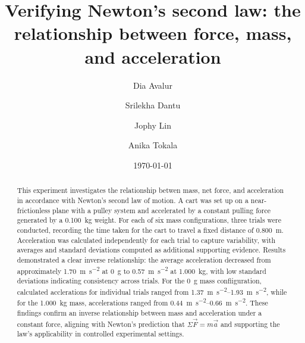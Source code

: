 ﻿\documentclass[reprint,amsmath,amssymb,aps]{revtex4-2}
\begin{document}
\title{Verifying Newton's second law: the relationship between force, mass, and acceleration}
\author{Dia Avalur}
\author{Srilekha Dantu}
\author{Jophy Lin}
\author{Anika Tokala}
\date{\today}

\begin{abstract}
This experiment investigates the relationship betwen mass, net force, and acceleration in accordance with Newton's second law of motion. A cart was set up on a near-frictionless plane with a pulley system and accelerated by a constant pulling force generated by a \qty{0.100}{\kilo\gram} weight. For each of six mass configurations, three trials were conducted, recording the time taken for the cart to travel a fixed distance of \qty{0.800}{\meter}. Acceleration was calculated independently for each trial to capture variability, with averages and standard deviations computed as additional supporting evidence. Results demonstrated a clear inverse relationship: the average acceleration decreased from approximately \qty{1.70}{\meter\per\second\squared} at \qty{0}{\gram} to \qty{0.57}{\meter\per\second\squared} at \qty{1.000}{\kilo\gram}, with low standard deviations indicating consistency across trials. For the \qty{0}{\gram} mass confiiguration, calculated acclerations for individual trials ranged from \qtyrange{1.37}{1.93}{\meter\per\second\squared}, while for the \qty{1.000}{\kilo\gram} mass, accelerations ranged from \qtyrange{0.44}{0.66}{\meter\per\second\squared}. These findings confirm an inverse relationship between mass and acceleration under a constant force, aligning with Newton's prediction that $\Sigma \vec{F} = m\vec{a}$ and supporting the law's applicability in controlled experimental settings.
\end{abstract}


\maketitle
\end{document}
